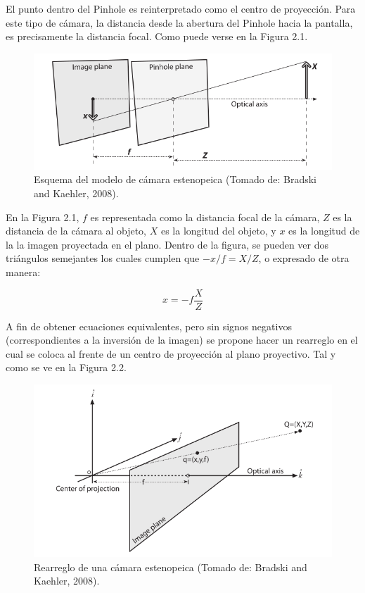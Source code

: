 \documentclass{book}
\begin{document}
El punto dentro del Pinhole es reinterpretado como el centro de proyección. Para este tipo de cámara, la distancia desde la abertura del Pinhole hacia la pantalla, es precisamente la distancia focal. Como puede verse en la Figura 2.1.\\
	
\begin{figure}
	\centering		
	\includegraphics[scale=0.4]{images/pinhole.png}
	\caption{Esquema del modelo de cámara estenopeica (Tomado de: Bradski and Kaehler, 2008).}		
\end{figure}

En la Figura 2.1, $f$ es representada como la distancia focal de la cámara, $Z$ es la distancia de la cámara al objeto, $X$ es la longitud del objeto, y $x$ es la longitud de la la imagen proyectada en el plano. Dentro de la figura, se pueden ver dos triángulos semejantes los cuales cumplen que $-x/f = X/Z$, o expresado de otra manera:

\[x = -f \frac{X}{Z}\]
	
A fin de obtener ecuaciones equivalentes, pero sin signos negativos (correspondientes a la inversión de la imagen) se propone hacer un rearreglo en el cual se coloca al frente de un centro de proyección al plano proyectivo. Tal y como se ve en la Figura 2.2.
	
\begin{figure}
	\centering
	\includegraphics[scale=0.4]{images/rearreglo_pinhole.png}
    \caption{Rearreglo de una cámara estenopeica (Tomado de: Bradski and Kaehler, 2008).}
\end{figure} 
\end{document}
